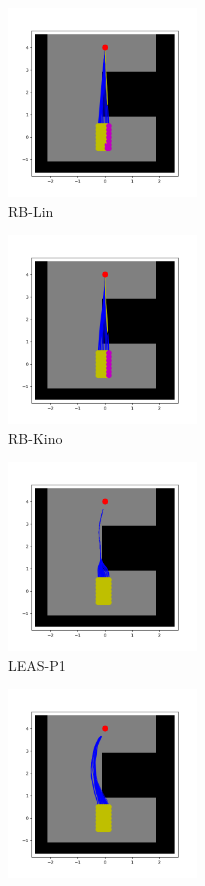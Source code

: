\begin{figure}[t]
    \captionsetup[subfigure]{justification=centering}
    \centering
    \begin{subfigure}[t]{0.48\linewidth}
        \includegraphics[width=\textwidth, height=5cm]{Figures/Chapter_CPSB/hole_Lin.png}
        \caption{RB-Lin}
    \end{subfigure}
    \begin{subfigure}[t]{0.48\linewidth}
        \includegraphics[width=\textwidth, height=5cm]{Figures/Chapter_CPSB/hole_Kino.png}
        \caption{RB-Kino}
    \end{subfigure}
    \begin{subfigure}[t]{0.48\linewidth}
        \includegraphics[width=\textwidth, height=5cm]{Figures/Chapter_CPSB/hole_LEAS-P1.png}
        \caption{LEAS-P1}
    \end{subfigure}
    \begin{subfigure}[t]{0.48\linewidth}
        \includegraphics[width=\textwidth, height=5cm]{Figures/Chapter_CPSB/hole_LEAS-P2.png}

\end{subfigure}
\end{figure}
